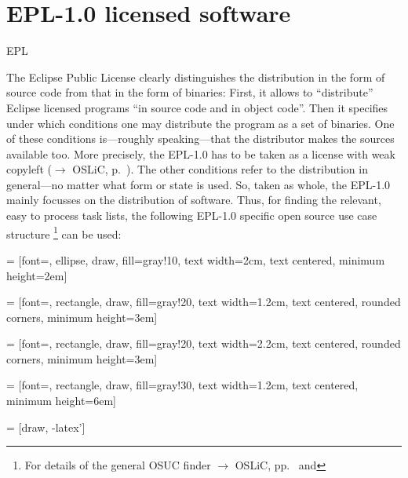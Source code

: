 \section{EPL-1.0 licensed software}
\begin{license}{EPL}

The Eclipse Public License clearly distinguishes the distribution in the form of
source code from that in the form of binaries: First, it allows to
\enquote{distribute} Eclipse licensed programs \enquote{in source code and in
object code}. Then it specifies under which conditions one may
distribute the program as a set of binaries. One of
these conditions is---roughly speaking---that the distributor makes the sources
available too. More precisely, the EPL-1.0 has to be taken as a
license with weak copyleft ($\rightarrow$ OSLiC, p.\ ).
The other conditions refer to the distribution in general---no matter what form
or state is used. So, taken as whole, the EPL-1.0 mainly
focusses on the distribution of software.  Thus, for finding the relevant, easy
to process task lists, the following EPL-1.0 specific open source use case 
structure%
  \footnote{For details of the general OSUC finder $\rightarrow$ OSLiC,
    pp.\ \pageref{OsucTokens} and \pageref{OsucDefinitionTree}}
can be used:
 
 = [font=\small, ellipse, draw, fill=gray!10, 
    text width=2cm, text centered, minimum height=2em]

 = [font=\footnotesize, rectangle, draw, fill=gray!20, 
    text width=1.2cm, text centered, rounded corners, minimum height=3em]

 = [font=\footnotesize, rectangle, draw, fill=gray!20, 
    text width=2.2cm, text centered, rounded corners, minimum height=3em]
    
 = [font=\tiny, rectangle, draw, fill=gray!30, 
    text width=1.2cm, text centered, minimum height=6em]

 = [draw, -latex']

\end{license}
